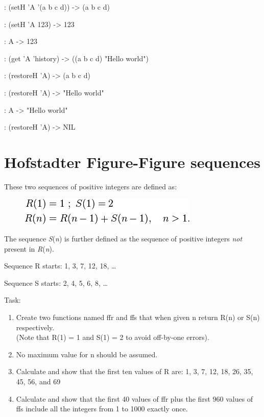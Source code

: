 \begin{itemize}
\begin{wideverbatim}
: (setH 'A '(a b c d))
-> (a b c d)

: (setH 'A 123)
-> 123

: A
-> 123

: (get 'A 'history)
-> ((a b c d) "Hello world")

: (restoreH 'A)
-> (a b c d)

: (restoreH 'A)
-> "Hello world"

: A
-> "Hello world"

: (restoreH 'A)
-> NIL

\end{wideverbatim}

\pagebreak{}
\section*{Hofstadter Figure-Figure sequences}

These two sequences of positive integers are defined as:

\begin{figure}[H]
\centering
\includegraphics[scale=.6]{graphics/8b92ddffc196683c9c4b2fb5f6f91d7c.png}
\end{figure}

The sequence \emph{S}(\emph{n}) is further defined as the sequence of
positive integers \emph{not} present in \emph{R}(\emph{n}).

Sequence R starts: 1, 3, 7, 12, 18, \ldots{}

Sequence S starts: 2, 4, 5, 6, 8, \ldots{}

Task:

\begin{enumerate}
\item
  Create two functions named ffr and ffs that when given n return R(n)
  or S(n) respectively.\\(Note that R(1) = 1 and S(1) = 2 to avoid
  off-by-one errors).
\item
  No maximum value for n should be assumed.
\item
  Calculate and show that the first ten values of R are: 1, 3, 7, 12,
  18, 26, 35, 45, 56, and 69
\item
  Calculate and show that the first 40 values of ffr plus the first 960
  values of ffs include all the integers from 1 to 1000 exactly once.
\end{enumerate}


\end{itemize}
